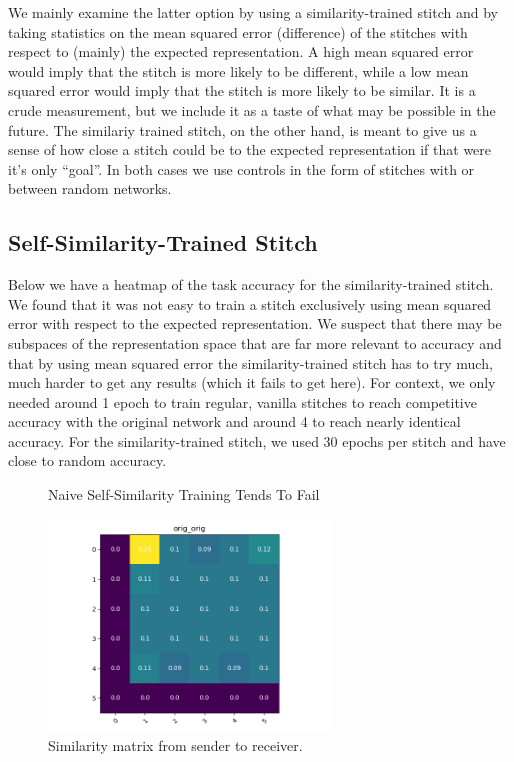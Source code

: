 \documentclass{article} %
\begin{document}
We mainly examine the latter option by using a similarity-trained stitch and by taking statistics on the mean squared
error (difference) of the stitches with respect to (mainly) the expected representation. A high mean squared error would
imply that the stitch is more likely to be different, while a low mean squared error would imply that the stitch is more
likely to be similar. It is a crude measurement, but we include it as a taste of what may be possible in the future. The
similariy trained stitch, on the other hand, is meant to give us a sense of how close a stitch could be to the expected
representation if that were it's only ``goal''. In both cases we use controls in the form of stitches with or between
random networks.

\subsection*{Self-Similarity-Trained Stitch}
Below we have a heatmap of the task accuracy for the similarity-trained stitch. We found that it was not
easy to train a stitch exclusively using mean squared error with respect to the expected representation. We suspect
that there may be subspaces of the representation space that are far more relevant to accuracy and that by using
mean squared error the similarity-trained stitch has to try much, much harder to get any results (which it fails
to get here). For context, we only needed around 1 epoch to train regular, vanilla stitches to reach competitive accuracy
with the original network and around 4 to reach nearly identical accuracy. For the similarity-trained stitch, we used 30
epochs per stitch and have close to random accuracy.

\begin{center}
   \begin{figure}[h!]
      \centering
      \caption{Naive Self-Similarity Training Tends To Fail}
      \includegraphics[width=7.5cm]{resnet1111_1111_autoencoder.png}
      \caption*{Similarity matrix from sender to receiver.}
   \end{figure}
\end{center}
\end{document}
